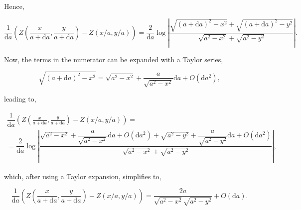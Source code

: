 \noindent Hence,

\begin{equation}
    \dfrac{1}{\text{d}a}\left(  Z(\frac{x}{a+\text{d}a}, \frac{y}{a+\text{d}a}) - Z(x/a, y/a) \right) = \dfrac{2}{\text{d}a}\log\left|\dfrac{\sqrt{(a+\text{d}a)^2-x^2}+\sqrt{(a+\text{d}a)^2-y^2}}{\sqrt{a^2-x^2}+\sqrt{a^2-y^2}}\right|. 
\end{equation}

\noindent Now, the terms in the numerator can be expanded with a Taylor series,

\begin{equation}
    \sqrt{(a+\text{d}a)^2-x^2} = \sqrt{a^2-x^2} + \dfrac{a}{\sqrt{a^2-x^2}}\text{d}a + O(\text{d}a^2),
\end{equation}

\noindent leading to, 

\begin{multline}
    \dfrac{1}{\text{d}a}\left(  Z(\frac{x}{a+\text{d}a}, \frac{y}{a+\text{d}a}) - Z(x/a, y/a) \right) = \\
    = \dfrac{2}{\text{d}a}\log\left|\dfrac{\sqrt{a^2-x^2} + \dfrac{a}{\sqrt{a^2-x^2}}\text{d}a + O(\text{d}a^2)+\sqrt{a^2-y^2} + \dfrac{a}{\sqrt{a^2-y^2}}\text{d}a + O(\text{d}a^2)}{\sqrt{a^2-x^2}+\sqrt{a^2-y^2}}\right|,
\end{multline}

\noindent which, after using a Taylor expansion, simplifies to, 

\begin{equation}
    \dfrac{1}{\text{d}a}\left(  Z(\frac{x}{a+\text{d}a}, \frac{y}{a+\text{d}a}) - Z(x/a, y/a) \right) =  \dfrac{2a}{\sqrt{a^2-x^2}\sqrt{a^2-y^2}} + O(\text{d}a).
\end{equation}


     

